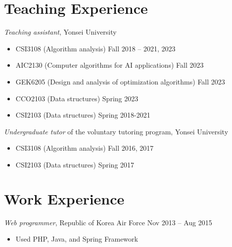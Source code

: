 \documentclass{cv}
\begin{document}
\section{Teaching Experience}
\textsl{Teaching assistant}, Yonsei University
\vspace{\killinitspace}
\begin{itemize}
\item CSI3108 (Algorithm analysis) \hfill Fall 2018 -- 2021, 2023
\item AIC2130 (Computer algorithms for AI applications) \hfill Fall 2023
\item GEK6205 (Design and analysis of optimization algorithms) \hfill Fall 2023
\item CCO2103 (Data structures) \hfill Spring 2023
\item CSI2103 (Data structures) \hfill Spring 2018-2021
\end{itemize}

\textsl{Undergraduate tutor} of the voluntary tutoring program, Yonsei University
\vspace{\killinitspace}
\begin{itemize}
\item CSI3108 (Algorithm analysis) \hfill Fall 2016, 2017
\item CSI2103 (Data structures) \hfill Spring 2017
\end{itemize}


\section{Work Experience}
\textsl{Web programmer}, Republic of Korea Air Force \hfill Nov 2013 -- Aug 2015
\vspace{\killinitspace}
\begin{itemize}
\item Used PHP, Java, and Spring Framework
\end{itemize}


\end{document}
